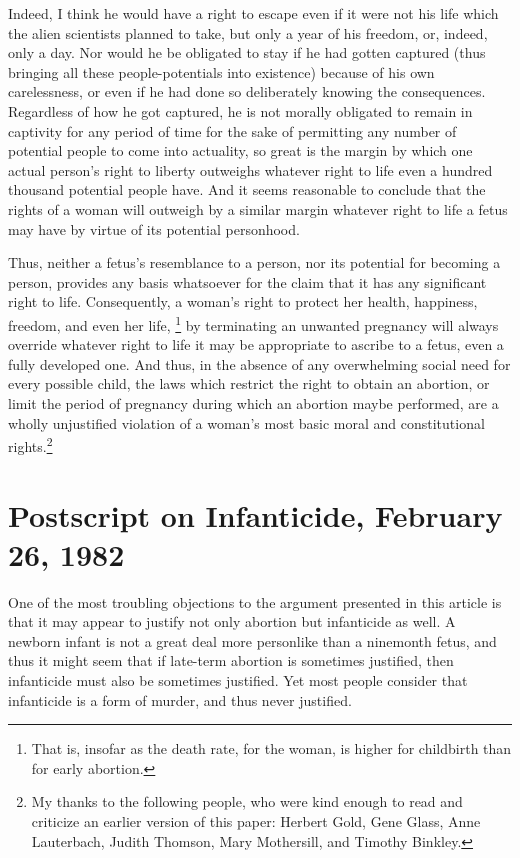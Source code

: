 Indeed, I think he would have a right to escape even if it
were not his life which the alien scientists planned to take,
but only a year of his freedom, or, indeed, only a day. Nor
would he be obligated to stay if he had gotten captured
(thus bringing all these people-potentials into existence)
because of his own carelessness, or even if he had done so
deliberately knowing the consequences. Regardless of
how he got captured, he is not morally obligated to
remain in captivity for any period of time for the sake of
permitting any number of potential people to come into
actuality, so great is the margin by which one actual
person’s right to liberty outweighs whatever right to life
even a hundred thousand potential people have. And it
seems reasonable to conclude that the rights of a woman
will outweigh by a similar margin whatever right to life a
fetus may have by virtue of its potential personhood.

Thus, neither a fetus’s resemblance to a person, nor its
potential for becoming a person, provides any basis
whatsoever for the claim that it has any significant right to
life. Consequently, a woman’s right to protect her health,
happiness, freedom, and even her life, \footnote{That is, insofar as the death rate, for the woman, is higher for
childbirth than for early abortion.} by terminating an
unwanted pregnancy will always override whatever right
to life it may be appropriate to ascribe to a fetus, even a
fully developed one. And thus, in the absence of any
overwhelming social need for every possible child, the
laws which restrict the right to obtain an abortion, or limit
the period of pregnancy during which an abortion maybe
performed, are a wholly unjustified violation of a
woman’s most basic moral and constitutional rights.\footnote{My thanks to the following people, who were kind enough to
read and criticize an earlier version of this paper: Herbert Gold,
Gene Glass, Anne Lauterbach, Judith Thomson, Mary
Mothersill, and Timothy Binkley.}

\section{Postscript on Infanticide, February 26, 1982}

One of the most troubling objections to the argument
presented in this article is that it may appear to justify not
only abortion but infanticide as well. A newborn infant is
not a great deal more personlike than a ninemonth fetus,
and thus it might seem that if late-term abortion is
sometimes justified, then infanticide must also be
sometimes justified. Yet most people consider that
infanticide is a form of murder, and thus never justified.

